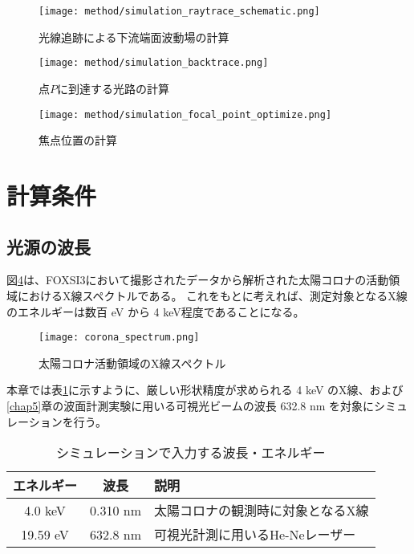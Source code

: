 \begin{figure}[h]
\centering
\texttt{[image: method/simulation\_raytrace\_schematic.png]}
\caption{光線追跡による下流端面波動場の計算}
\label{fig:simulation_raytrace}
\end{figure}

\begin{figure}[h]
\centering
\texttt{[image: method/simulation\_backtrace.png]}
\caption{点$P$に到達する光路の計算}
\label{fig:simulation_backtrace}
\end{figure}

\begin{figure}[h]
\centering
\texttt{[image: method/simulation\_focal\_point\_optimize.png]}
\caption{焦点位置の計算}
\label{fig:simulation_focal_point_optimize}
\end{figure}



\clearpage
\newpage

\section{計算条件}
\label{chap2_simulation_condition}


\subsection{光源の波長}
\label{chap2_incident_beam_energy}

図\ref{fig:corona_spectrum}は、FOXSI3において撮影されたデータから解析された太陽コロナの活動領域におけるX線スペクトルである。\cite{2019AGUFMSH31C3315V}
これをもとに考えれば、測定対象となるX線のエネルギーは数百 eV から 4 keV程度であることになる。

\begin{figure}[ht]
\centering
\texttt{[image: corona\_spectrum.png]}
\caption{太陽コロナ活動領域のX線スペクトル\cite{2019AGUFMSH31C3315V}}
\label{fig:corona_spectrum}
\end{figure}

本章では表\ref{tb:simulation_target_energy}に示すように、厳しい形状精度が求められる 4 keV のX線、および\ref{chap5}章の波面計測実験に用いる可視光ビームの波長 632.8 nm を対象にシミュレーションを行う。

\begin{table}[!ht]
\begin{center}
  \caption{シミュレーションで入力する波長・エネルギー}
  \begin{tabular}{|c|c|l|} \hline
    エネルギー & 波長 & 説明 \\ \hline
    4.0 keV & 0.310 nm & 太陽コロナの観測時に対象となるX線 \\
    19.59 eV & 632.8 nm & 可視光計測に用いるHe-Neレーザー \\ \hline
  \end{tabular}
  \label{tb:simulation_target_energy}
\end{center}
\end{table}

